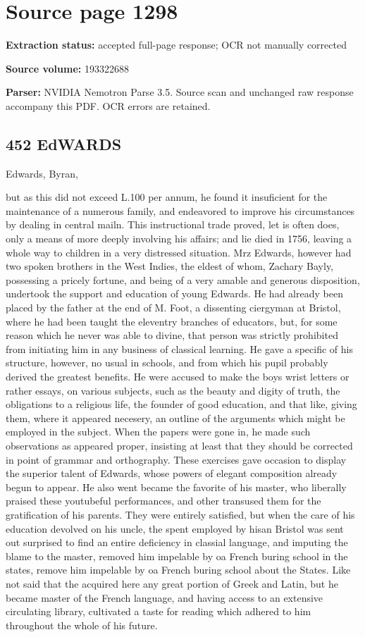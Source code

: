 \clearpage
\section{Source page 1298}
\textbf{Extraction status:} accepted full-page response; OCR not manually corrected\par
\textbf{Source volume:} 193322688\par
\textbf{Parser:} NVIDIA Nemotron Parse 3.5. Source scan and unchanged raw response accompany this PDF. OCR errors are retained.\par\medskip
\subsection*{452 EdWARDS}
Edwards, Byran,\par\medskip
but as this did not exceed L.100 per annum, he found it insuficient for the maintenance of a numerous family, and endeavored to improve his circumstances by dealing in central mailn. This instructional trade proved, let is often does, only a means of more deeply involving his affairs; and lie died in 1756, leaving a whole way to children in a very distressed situation. Mrz Edwards, however had two spoken brothers in the West Indies, the eldest of whom, Zachary Bayly, possessing a pricely fortune, and being of a very amable and generous disposition, undertook the support and education of young Edwards. He had already been placed by the father at the end of M. Foot, a dissenting ciergyman at Bristol, where he had been taught the eleventry branches of educators, but, for some reason which he never was able to divine, that person was strictly prohibited from initiating him in any business of classical learning. He gave a specific of his structure, however, no usual in schools, and from which his pupil probably derived the greatest benefits. He were accused to make the boys wrist letters or rather essays, on various subjects, such as the beauty and digity of truth, the obligations to a religious life, the founder of good education, and that like, giving them, where it appeared necesery, an outline of the arguments which might be employed in the subject. When the papers were gone in, he made such observations as appeared proper, insisting at least that they should be corrected in point of grammar and orthography. These exercises gave occasion to display the superior talent of Edwards, whose powers of elegant composition already begun to appear. He also went became the favorite of his master, who liberally praised these youtubeful performances, and other transused them for the gratification of his parents. They were entirely satisfied, but when the care of his education devolved on his uncle, the spent employed by hisan Bristol was sent out surprised to find an entire deficiency in classial language, and imputing the blame to the master, removed him impelable by oa French buring school in the states, remove him impelable by oa French buring school about the States. Like not said that the acquired here any great portion of Greek and Latin, but he became master of the French language, and having access to an extensive circulating library, cultivated a taste for reading which adhered to him throughout the whole of his future.\par\medskip
